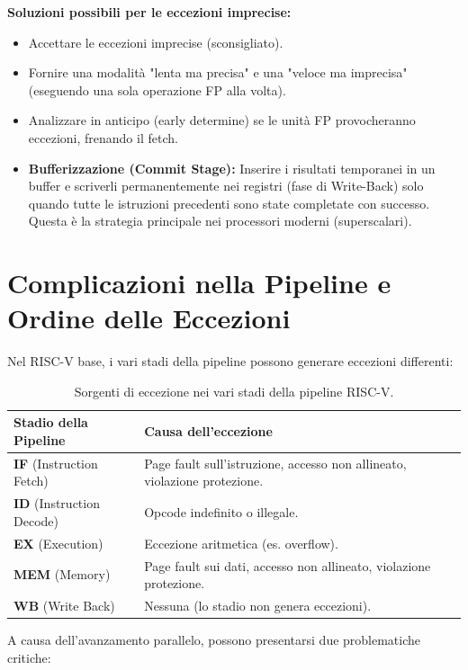 \textbf{Soluzioni possibili per le eccezioni imprecise:}
\begin{itemize}
    \item Accettare le eccezioni imprecise (sconsigliato).
    \item Fornire una modalità "lenta ma precisa" e una "veloce ma imprecisa" (eseguendo una sola operazione FP alla volta).
    \item Analizzare in anticipo (early determine) se le unità FP provocheranno eccezioni, frenando il fetch.
    \item \textbf{Bufferizzazione (Commit Stage):} Inserire i risultati temporanei in un buffer e scriverli permanentemente nei registri (fase di Write-Back) solo quando tutte le istruzioni precedenti sono state completate con successo. Questa è la strategia principale nei processori moderni (superscalari).
\end{itemize}

\section{Complicazioni nella Pipeline e Ordine delle Eccezioni}

Nel RISC-V base, i vari stadi della pipeline possono generare eccezioni differenti:
\begin{table}[H]
    \centering
    \begin{tabular}{|l|l|}
        \hline
        \textbf{Stadio della Pipeline} & \textbf{Causa dell'eccezione} \\ \hline
        \textbf{IF} (Instruction Fetch) & Page fault sull'istruzione, accesso non allineato, violazione protezione. \\ \hline
        \textbf{ID} (Instruction Decode) & Opcode indefinito o illegale. \\ \hline
        \textbf{EX} (Execution) & Eccezione aritmetica (es. overflow). \\ \hline
        \textbf{MEM} (Memory) & Page fault sui dati, accesso non allineato, violazione protezione. \\ \hline
        \textbf{WB} (Write Back) & Nessuna (lo stadio non genera eccezioni). \\ \hline
    \end{tabular}
    \caption{Sorgenti di eccezione nei vari stadi della pipeline RISC-V.}
\end{table}

A causa dell'avanzamento parallelo, possono presentarsi due problematiche critiche:


